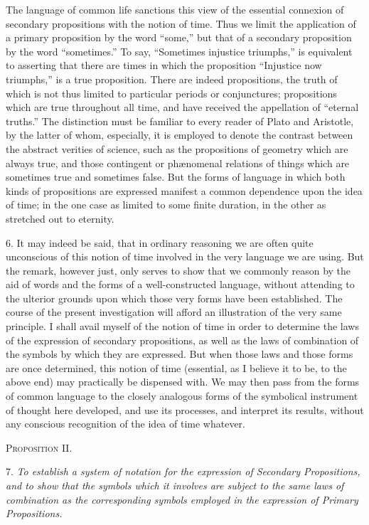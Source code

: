 \documentclass[oneside]{book}
\begin{document}
The language of common life sanctions this view of the
essential connexion of secondary propositions with the notion of
time. Thus we limit the application of a primary proposition by
the word ``some,'' but that of a secondary proposition by the
word ``sometimes.'' To say, ``Sometimes injustice triumphs,''
is equivalent to asserting that there are times in which the
proposition ``Injustice now triumphs,'' is a true proposition. There
are indeed propositions, the truth of which is not thus limited to
particular periods or conjunctures; propositions which are true
throughout all time, and have received the appellation of
``eternal truths.'' The distinction must be familiar to every reader of
Plato and Aristotle, by the latter of whom, especially, it is
employed to denote the contrast between the abstract verities of
science, such as the propositions of geometry which are always
true, and those contingent or ph{\ae}nomenal relations of things
which are sometimes true and sometimes false. But the forms of
language in which both kinds of propositions are expressed
manifest a common dependence upon the idea of time; in the one
case as limited to some finite duration, in the other as stretched
out to eternity.

6. It may indeed be said, that in ordinary reasoning we are
often quite unconscious of this notion of time involved in the very
language we are using. But the remark, however just, only
serves to show that we commonly reason by the aid of words
and the forms of a well-constructed language, without attending
to the ulterior grounds upon which those very forms have been
established. The course of the present investigation will afford an
illustration of the very same principle. I shall avail myself of
the notion of time in order to determine the laws of the expression
of secondary propositions, as well as the laws of combination of
the symbols by which they are expressed. But when those
laws and those forms are once determined, this notion of time
(essential, as I believe it to be, to the above end) may practically
be dispensed with. We may then pass from the forms of
common language to the closely analogous forms of the symbolical
instrument of thought here developed, and use its processes, and
interpret its results, without any conscious recognition of the idea
of time whatever.

\begin{center}
\textsc{Proposition II.}
\end{center}

7. \textit{To establish a system of notation for the expression of
Secondary Propositions, and to show that the symbols which it
involves are subject to the same laws of combination as the
corresponding symbols employed in the expression of Primary
Propositions.}
\end{document}
